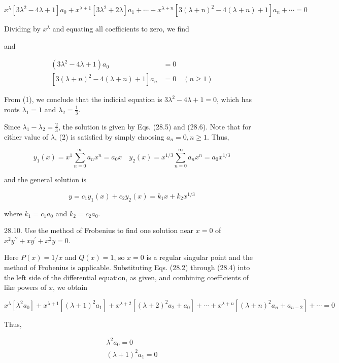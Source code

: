 \documentclass[10pt]{article}
\begin{document}
$$
x^{\lambda}\left[3 \lambda^{2}-4 \lambda+1\right] a_{0}+x^{\lambda+1}\left[3 \lambda^{2}+2 \lambda\right] a_{1}+\cdots+x^{\lambda+n}\left[3(\lambda+\mathrm{n})^{2}-4(\lambda+n)+1\right] a_{n}+\cdots=0
$$

Dividing by $x^{\lambda}$ and equating all coefficients to zero, we find

and


\begin{align*}
\left(3 \lambda^{2}-4 \lambda+1\right) a_{0} & =0  \tag{1}\\
{\left[3(\lambda+n)^{2}-4(\lambda+n)+1\right] a_{n} } & =0 \quad(n \geq 1) \tag{2}
\end{align*}


From (1), we conclude that the indicial equation is $3 \lambda^{2}-4 \lambda+1=0$, which has roots $\lambda_{1}=1$ and $\lambda_{2}=\frac{1}{3}$.

Since $\lambda_{1}-\lambda_{2}=\frac{2}{3}$, the solution is given by Eqs. (28.5) and (28.6). Note that for either value of $\lambda$, (2) is satisfied by simply choosing $a_{n}=0, n \geq 1$. Thus,

$$
y_{1}(x)=x^{1} \sum_{n=0}^{\infty} a_{n} x^{n}=a_{0} x \quad y_{2}(x)=x^{1 / 3} \sum_{n=0}^{\infty} a_{n} x^{n}=a_{0} x^{1 / 3}
$$

and the general solution is

$$
y=c_{1} y_{1}(x)+c_{2} y_{2}(x)=k_{1} x+k_{2} x^{1 / 3}
$$

where $k_{1}=c_{1} a_{0}$ and $k_{2}=c_{2} a_{0}$.

28.10. Use the method of Frobenius to find one solution near $x=0$ of $x^{2} y^{\prime \prime}+x y^{\prime}+x^{2} y=0$.

Here $P(x)=1 / x$ and $Q(x)=1$, so $x=0$ is a regular singular point and the method of Frobenius is applicable. Substituting Eqs. (28.2) through (28.4) into the left side of the differential equation, as given, and combining coefficients of like powers of $x$, we obtain

$$
x^{\lambda}\left[\lambda^{2} a_{0}\right]+x^{\lambda+1}\left[(\lambda+1)^{2} a_{1}\right]+x^{\lambda+2}\left[(\lambda+2)^{2} a_{2}+a_{0}\right]+\cdots+x^{\lambda+n}\left[(\lambda+n)^{2} a_{n}+a_{n-2}\right]+\cdots=0
$$

Thus,


\begin{gather*}
\lambda^{2} a_{0}=0  \tag{1}\\
(\lambda+1)^{2} a_{1}=0 \tag{2}
\end{gather*}
\end{document}
